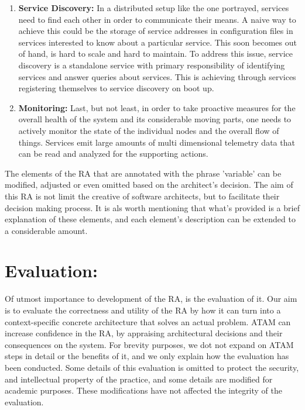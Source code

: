 \documentclass[runningheads]{llncs}
\begin{document}
\begin{enumerate}
    \item \textbf{Service Discovery:} In a distributed setup like the one portrayed, services need to find each other in order to communicate their means. A naive way to achieve this could be the storage of service addresses in configuration files in services interested to know about a particular service. This soon becomes out of hand, is hard to scale and hard to maintain. To address this issue, service discovery is a standalone service with primary responsibility of identifying services and answer queries about services. This is achieving through services registering themselves to service discovery on boot up.
    \item \textbf{Monitoring:} Last, but not least, in order to take proactive measures for the overall health of the system and its considerable moving parts, one needs to actively monitor the state of the individual nodes and the overall flow of things. Services emit large amounts of multi dimensional telemetry data that can be read and analyzed for the supporting actions. 
\end{enumerate}

The elements of the RA that are annotated with the phrase 'variable' can be modified, adjusted or even omitted based on the architect's decision. The aim of this RA is not limit the creative of software architects, but to facilitate their decision making process. It is als worth mentioning that what's provided is a brief explanation of these elements, and each element's description can be extended to a considerable amount.  

\section*{Evaluation:}

Of utmost importance to development of the RA, is the evaluation of it. Our aim is to evaluate the correctness and utility of the RA by how it can turn into a context-specific concrete architecture that solves an actual problem. ATAM can increase confidence in the RA, by appraising architectural decisions and their consequences on the system. For brevity purposes, we dot not expand on ATAM steps in detail or the benefits of it, and we only explain how the evaluation has been conducted. Some details of this evaluation is omitted to protect the security, and intellectual property of the practice, and some details are modified for academic purposes. These modifications have not affected the integrity of the evaluation.  
\end{document}
